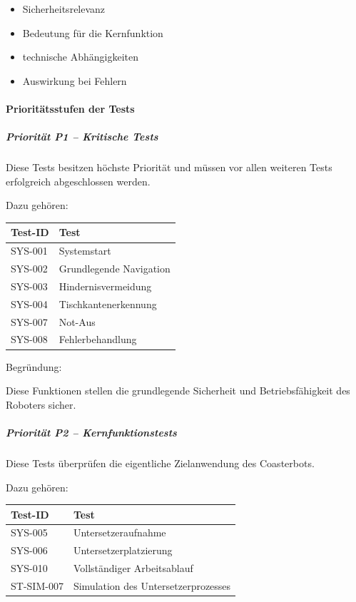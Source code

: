 \begin{itemize}
\tightlist
\item
  Sicherheitsrelevanz
\item
  Bedeutung für die Kernfunktion
\item
  technische Abhängigkeiten
\item
  Auswirkung bei Fehlern
\end{itemize}

\paragraph{Prioritätsstufen der
Tests}\label{priorituxe4tsstufen-der-tests}

\subparagraph{Priorität P1 -- Kritische
Tests}\label{priorituxe4t-p1-kritische-tests-1}

Diese Tests besitzen höchste Priorität und müssen vor allen weiteren
Tests erfolgreich abgeschlossen werden.

Dazu gehören:

\begin{longtable}[]{@{}ll@{}}
\toprule\noalign{}
Test-ID & Test \\
\midrule\noalign{}
\endhead
\bottomrule\noalign{}
\endlastfoot
SYS-001 & Systemstart \\
SYS-002 & Grundlegende Navigation \\
SYS-003 & Hindernisvermeidung \\
SYS-004 & Tischkantenerkennung \\
SYS-007 & Not-Aus \\
SYS-008 & Fehlerbehandlung \\
\end{longtable}

Begründung:

Diese Funktionen stellen die grundlegende Sicherheit und
Betriebsfähigkeit des Roboters sicher.

\subparagraph{Priorität P2 --
Kernfunktionstests}\label{priorituxe4t-p2-kernfunktionstests}

Diese Tests überprüfen die eigentliche Zielanwendung des Coasterbots.

Dazu gehören:

\begin{longtable}[]{@{}ll@{}}
\toprule\noalign{}
Test-ID & Test \\
\midrule\noalign{}
\endhead
\bottomrule\noalign{}
\endlastfoot
SYS-005 & Untersetzeraufnahme \\
SYS-006 & Untersetzerplatzierung \\
SYS-010 & Vollständiger Arbeitsablauf \\
ST-SIM-007 & Simulation des Untersetzerprozesses \\
\end{longtable}

